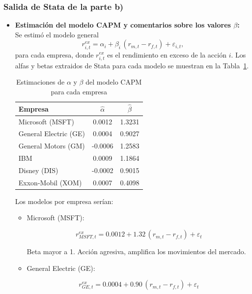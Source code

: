 \documentclass[12pt]{article}
\begin{document}
\subsubsection*{Salida de Stata de la parte b)}



\begin{itemize}
  \item \textbf{Estimación del modelo CAPM y comentarios sobre los valores $\beta$:} \\
  Se estimó el modelo general
  \[
    r_{i,t}^{ex} = \alpha_i + \beta_i \,(r_{m,t} - r_{f,t}) + \varepsilon_{i,t},
  \]
  para cada empresa, donde $r_{i,t}^{ex}$ es el rendimiento en exceso de la acción $i$. Los alfas y betas extraidos de Stata para cada modelo se muestran en la Tabla~\ref{tab:capm}. 

\begin{table}[h!]
\centering
\caption{Estimaciones de $\alpha$ y $\beta$ del modelo CAPM para cada empresa}
\label{tab:capm}
\begin{tabular}{lcc}
\hline
\textbf{Empresa} & \textbf{$\hat{\alpha}$} & \textbf{$\hat{\beta}$} \\
\hline
Microsoft (MSFT)      & 0.0012 & 1.3231 \\
General Electric (GE) & 0.0004 & 0.9027 \\
General Motors (GM)   & -0.0006 & 1.2583 \\
IBM                   & 0.0009 & 1.1864 \\
Disney (DIS)          & -0.0002 & 0.9015 \\
Exxon-Mobil (XOM)     & 0.0007 & 0.4098 \\
\hline
\end{tabular}
\end{table}

Los modelos por empresa serían:

  \begin{itemize}
    \item Microsoft (MSFT): 
    
    \[
      r_{MSFT,t}^{ex} = 0.0012 + 1.32 \,(r_{m,t} - r_{f,t}) + \varepsilon_t
    \] 
    
    Beta mayor a 1. Acción agresiva, amplifica los movimientos del mercado.
    
    \item General Electric (GE): 
    
    \[
      r_{GE,t}^{ex} = 0.0004 + 0.90 \,(r_{m,t} - r_{f,t}) + \varepsilon_t
    \] 
    

\end{itemize}
\end{itemize}
\end{document}
